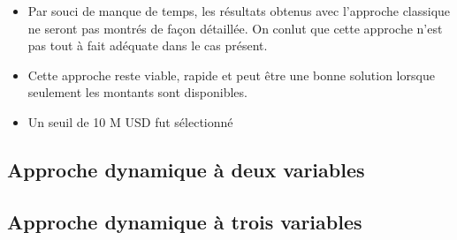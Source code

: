 \begin{frame}
\begin{itemize}
\item Par souci de manque de temps, les résultats obtenus avec l'approche classique ne seront pas montrés de façon détaillée. On conlut que cette approche n'est pas tout à fait adéquate dans le cas présent. 
\item Cette approche reste viable, rapide et peut être une bonne solution lorsque seulement les montants sont disponibles.
\item Un seuil de 10 M USD fut sélectionné
\end{itemize}
\end{frame}



\subsection{Approche dynamique à deux variables}

\subsection{Approche dynamique à trois variables}
